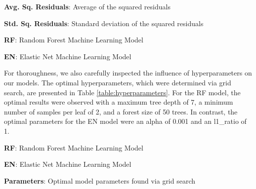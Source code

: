 \documentclass[11pt]{article}
\begin{document}
\begin{table}[h]
\caption{Summary statistics of the squared residuals for test datasets using the RF and EN models.}
\label{table:summary_statistics}
\begin{threeparttable}
\renewcommand{\TPTminimum}{\linewidth}
\begin{tablenotes}
\footnotesize
\item \textbf{Avg. Sq. Residuals}: Average of the squared residuals
\item \textbf{Std. Sq. Residuals}: Standard deviation of the squared residuals
\item \textbf{RF}: Random Forest Machine Learning Model
\item \textbf{EN}: Elastic Net Machine Learning Model
\end{tablenotes}
\end{threeparttable}
\end{table}


For thoroughness, we also carefully inspected the influence of hyperparameters on our models. The optimal hyperparameters, which were determined via grid search, are presented in Table {}\ref{table:hyperparameters}. For the RF model, the optimal results were observed with a maximum tree depth of 7, a minimum number of samples per leaf of 2, and a forest size of 50 trees. In contrast, the optimal parameters for the EN model were an alpha of 0.001 and an l1\_ratio of 1.

\begin{table}[h]
\caption{Optimal hyperparameters for the RF and EN models.}
\label{table:hyperparameters}
\begin{threeparttable}
\renewcommand{\TPTminimum}{\linewidth}
\begin{tablenotes}
\footnotesize
\item \textbf{RF}: Random Forest Machine Learning Model
\item \textbf{EN}: Elastic Net Machine Learning Model
\item \textbf{Parameters}: Optimal model parameters found via grid search
\end{tablenotes}
\end{threeparttable}
\end{table}
\end{document}
